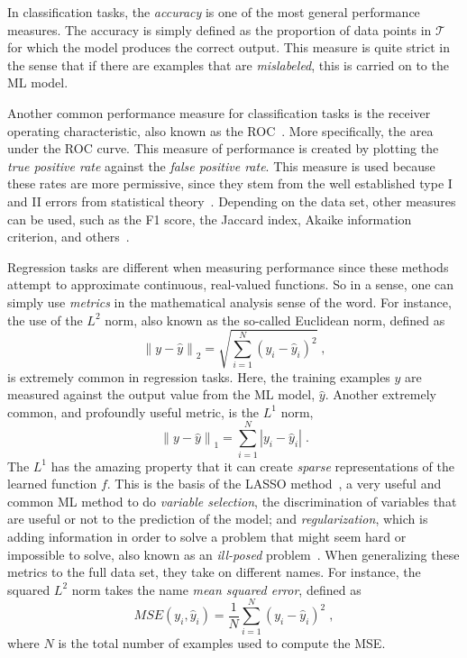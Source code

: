 In classification tasks, the \emph{accuracy} is one of the most general performance 
measures. The accuracy is simply defined as the proportion of data points in $\mathcal{T}$ 
for which the model produces the correct output. This measure is quite strict in the sense 
that if there are examples that are \emph{mislabeled}, this is carried on to the ML model.

Another common performance measure for classification tasks is the receiver operating 
characteristic, also known as the ROC~\cite{hastieElementsStatisticalLearning2009}. More 
specifically, the area under the ROC curve. This measure of performance is created by 
plotting the \emph{true positive rate} against the \emph{false positive rate}. This measure 
is used because these rates are more permissive, since they stem from the well established 
type I and II errors from statistical theory~\cite{riceMathematicalStatisticsData2006}. 
Depending on the data set, other measures can 
be used, such as the F1 score, the Jaccard index, Akaike information criterion, and 
others~\cite{murphyMachineLearningProbabilistic2012}.

Regression tasks are different when measuring performance since these methods attempt to 
approximate continuous, real-valued functions. So in a sense, one can simply use \emph
{metrics} in the mathematical analysis sense of the word. For instance, the use of the 
$L^2$ norm, also known as the so-called Euclidean norm, defined as
\begin{equation}
    { \left\lVert y - \hat{y} \right\rVert }_{2} = \sqrt{ \sum_{i=1}^{N} { \left(y_i - \hat{y}_i \right) }^2 }
    \; ,
    \label{eq:l2norm}
\end{equation}
is extremely common in regression tasks. Here, the training examples $y$ are measured 
against the output value from the ML model, $\hat{y}$. Another extremely common, and 
profoundly useful metric, is the $L^1$ norm,
\begin{equation}
    { \left\lVert y - \hat{y} \right\rVert }_{1} = \sum_{i=1}^{N} \left\lvert y_i - \hat{y}_i \right\rvert
    \; .
    \label{eq:l1norm}
\end{equation}
The $L^1$ has the amazing property that it can create \emph{sparse} representations of the 
learned function $f$. This is the basis of the LASSO method~\cite{hastieElementsStatisticalLearning2009}, a very useful and common ML method to do 
\emph{variable selection}, the discrimination of variables that are useful or not to the 
prediction of the model; and \emph{regularization}, which is adding information in order to 
solve a problem that might seem hard or impossible to solve, also known as an
\emph{ill-posed} problem~\cite{goodfellowDeepLearning2016}.
When generalizing these metrics to the full data set, they take on different names. For 
instance, the squared $L^2$ norm takes the name \emph{mean squared error}, defined as
\begin{equation}
    MSE \left( y_i, \hat{y}_i \right) = \frac{1}{N} \sum_{i=1}^{N} { \left(y_i - \hat{y}_i \right) }^2
    \; ,
    \label{eq:mse} 
\end{equation}
where $N$ is the total number of examples used to compute the MSE.


